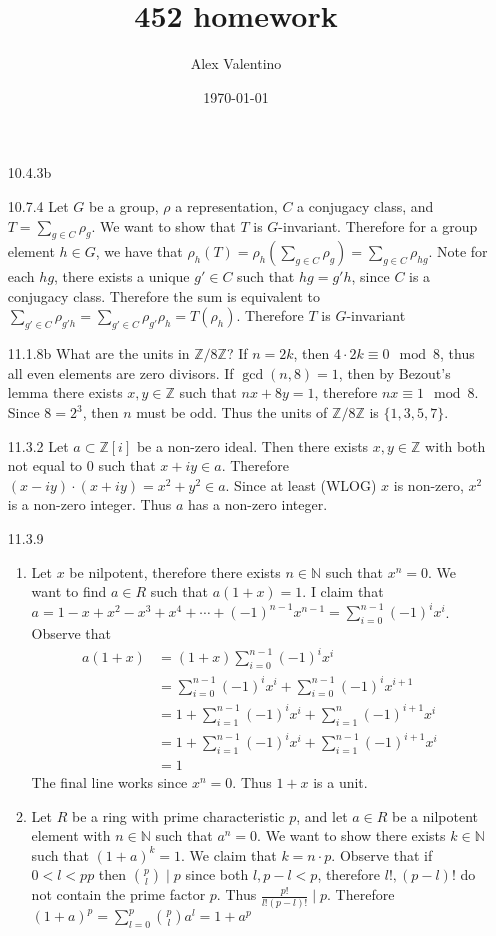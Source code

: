 \documentclass[12pt, letterpaper]{article}
\date{\today}
\author{Alex Valentino}
\title{452 homework}
\newcommand{\Z}{\mathbb{Z}}
\newcommand{\N}{\mathbb{N}}
\begin{document}
\begin{enumerate}
	\item[10.4.3b]
	\item[10.7.4] Let $G$ be a group, $\rho$ a representation, $C$ a conjugacy class, and 
	$T = \sum_{g \in C}\rho_g$.  We want to show 
	that $T$ is $G$-invariant.  Therefore 
	for a group element $h\in G$, we have that 
	$\rho_h(T) = \rho_h(\sum_{g \in C} \rho_{g}) = \sum_{g \in C} \rho_{hg}$.  Note for each $hg$, there exists 
	a unique $g' \in C$ such that $hg = g'h$, since $C$ is a conjugacy class.  Therefore 
	the sum is equivalent to 
	$\sum_{g' \in C} \rho_{g'h} = \sum_{g' \in C} \rho_{g'} \rho_h = T(\rho_h)$.  Therefore $T$ is $G$-invariant 
	\item[11.1.8b] What are the units in $\Z/8\Z$?  
	If $n = 2k$, then $4\cdot 2k \equiv 0 \mod{8}$, thus 
	all even elements are zero divisors.  If $\gcd(n,8) = 
	1$, then by Bezout's lemma there exists $x,y \in \Z$
	such that $nx + 8y = 1$, therefore $nx\equiv 1 \mod{8}$.
	Since $8=2^3$, then $n$ must be odd.  Thus the 
	units of $\Z/8\Z$ is $\{1,3,5,7\}$.  
	\item[11.3.2] Let $a \subset \Z[i]$ be a non-zero ideal.
	Then there exists $x,y\in \Z$ with both not 
	equal to 0 such that 
	$x+ iy \in a$.  Therefore 
	$(x-iy)\cdot (x+iy) = x^2 + y^2 \in a$.  Since at least 
	(WLOG) $x$ is non-zero, $x^2$ is a non-zero integer.
	Thus $a$ has a non-zero integer.    	
	\item[11.3.9]
	\begin{enumerate}
		\item Let $x$ be nilpotent, therefore there 
		exists $n \in \N$ such that $x^n = 0$.  We 
		want to find $a \in R$ such that 
		$a(1+x) = 1$.  I claim that 
		$a = 1 - x + x^2 - x^3 + x^4 + \cdots + 
		(-1)^{n-1} x^{n-1} = \sum_{i=0}^{n-1} (-1)^i x^i$.
		Observe that 
		\begin{align*}
		a(1+x) &= (1+x)\sum_{i=0}^{n-1} (-1)^i x^i\\
		&= 
		\sum_{i=0}^{n-1} (-1)^i x^i + \sum_{i=0}^{n-1} (-1)^i x^{i+1}\\
		 &= 1 +  \sum_{i=1}^{n-1} (-1)^i x^i + 
		\sum_{i=1}^{n} (-1)^{i+1} x^i \\
		&= 1 +  \sum_{i=1}^{n-1} (-1)^i x^i + 
		\sum_{i=1}^{n-1} (-1)^{i+1} x^i \\
		&= 1
		\end{align*}
		The final line works since $x^n = 0$.  Thus 
		$1+x$ is a unit.  
		\item Let $R$ be a ring with prime 
		characteristic $p$, and let $a \in R$ be a 
		nilpotent element with $n\in \N$ such that 
		$a^n = 0$.  We want to show there exists 
		$k \in \N$ such that $(1+a)^k = 1$.  
		We claim that $k=n \cdot p$.  Observe that 
		if $0 < l < pp$ then $\binom{p}{l} \mid p$ since 
		both $l, p-l < p$, therefore $l!, (p-l)!$ do not 
		contain the prime factor $p$.  Thus 
		$\frac{p!}{l!(p-l)!} \mid p$.  Therefore 
		$(1+a)^p = \sum_{l=0}^p \binom{p}{l} a^l = 1 + a^p
		$
		
	\end{enumerate}
\end{enumerate}
\end{document}
